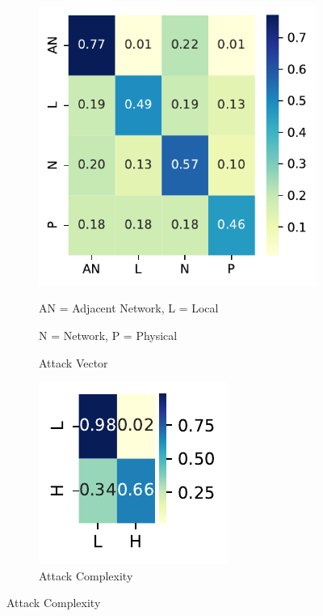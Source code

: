 \documentclass[12pt]{article}
\begin{document}
\begin{figure}
	\centering
	\begin{subfigure}[b]{0.45\textwidth}
		\includegraphics[width=\textwidth]{./figures/confusion_matrices/attack_vector_nvd.pdf}
		\caption{Attack Vector}

		\begin{tablenotes}
			\footnotesize
			\item \quad AN = Adjacent Network, L = Local
			\item \quad N = Network, P = Physical
		\end{tablenotes}
	\end{subfigure}
	\hfill
	\begin{subfigure}[b]{0.45\textwidth}
		\includegraphics[width=\textwidth]{./figures/confusion_matrices/attack_complexity_nvd.pdf}
		\caption{Attack Complexity}


\end{subfigure}
\end{figure}
\end{document}
